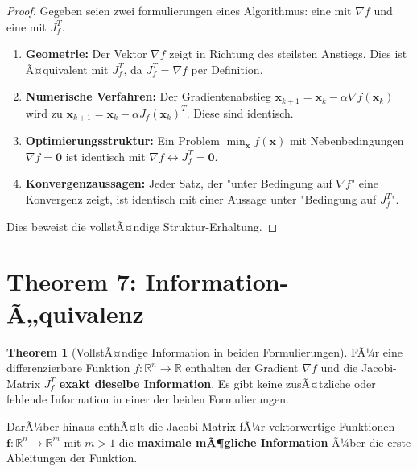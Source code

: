 ﻿\documentclass[a4paper,12pt]{article}
\theoremstyle{definition}
\newtheorem{theorem}{Theorem}
\begin{document}
\begin{proof}
	Gegeben seien zwei formulierungen eines Algorithmus: eine mit $\nabla f$ und eine mit $J_f^T$.
	
	\begin{enumerate}
		\item \textbf{Geometrie:} Der Vektor $\nabla f$ zeigt in Richtung des steilsten Anstiegs. Dies ist Ã¤quivalent mit $J_f^T$, da $J_f^T = \nabla f$ per Definition.
		
		\item \textbf{Numerische Verfahren:} Der Gradientenabstieg $\boldsymbol{x}_{k+1} = \boldsymbol{x}_k - \alpha \nabla f(\boldsymbol{x}_k)$ wird zu $\boldsymbol{x}_{k+1} = \boldsymbol{x}_k - \alpha J_f(\boldsymbol{x}_k)^T$. Diese sind identisch.
		
		\item \textbf{Optimierungsstruktur:} Ein Problem $\min_{\boldsymbol{x}} f(\boldsymbol{x})$ mit Nebenbedingungen $\nabla f = \boldsymbol{0}$ ist identisch mit $\nabla f \leftrightarrow J_f^T = \boldsymbol{0}$.
		
		\item \textbf{Konvergenzaussagen:} Jeder Satz, der "unter Bedingung auf $\nabla f$" eine Konvergenz zeigt, ist identisch mit einer Aussage unter "Bedingung auf $J_f^T$".
	\end{enumerate}
	
	Dies beweist die vollstÃ¤ndige Struktur-Erhaltung.
\end{proof}

\section{Theorem 7: Information-Ã„quivalenz}

\begin{theorem}[VollstÃ¤ndige Information in beiden Formulierungen]
	\label{thm:information}
	FÃ¼r eine differenzierbare Funktion $f: \mathbb{R}^n \to \mathbb{R}$ enthalten der Gradient $\nabla f$ und die Jacobi-Matrix $J_f^T$ \textbf{exakt dieselbe Information}. Es gibt keine zusÃ¤tzliche oder fehlende Information in einer der beiden Formulierungen.
	
	DarÃ¼ber hinaus enthÃ¤lt die Jacobi-Matrix fÃ¼r vektorwertige Funktionen $\boldsymbol{f}: \mathbb{R}^n \to \mathbb{R}^m$ mit $m > 1$ die \textbf{maximale mÃ¶gliche Information} Ã¼ber die erste Ableitungen der Funktion.
\end{theorem}
\end{document}
